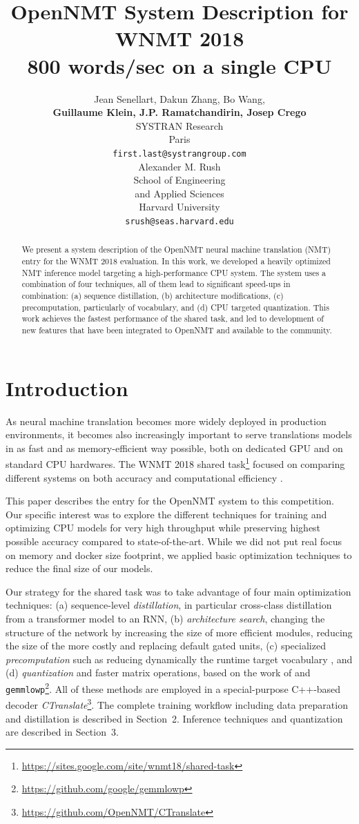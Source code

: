\documentclass[11pt,a4paper]{article}
\title{OpenNMT System Description for WNMT 2018 \protect\\ 800 words/sec on a single CPU}
\author{Jean Senellart, Dakun Zhang, Bo Wang,\\{\bf Guillaume Klein, J.P. Ramatchandirin, Josep Crego}\\
  SYSTRAN Research\\
  Paris \\
  {\tt first.last@systrangroup.com} \\\And
  Alexander M. Rush\\
  School of Engineering \\
  and Applied Sciences \\
  Harvard University \\
  {\tt srush@seas.harvard.edu} \\}
\date{}
\begin{document}
\maketitle
\begin{abstract}

  We present a system description of the OpenNMT neural machine translation (NMT) entry for the WNMT 2018 evaluation.
  In this work, we developed a heavily optimized NMT inference model
  targeting a high-performance CPU system. The system uses a
  combination of four techniques, all of them lead to significant
  speed-ups in combination: (a) sequence distillation, (b)
  architecture modifications, (c) precomputation, particularly of
  vocabulary, and (d) CPU targeted quantization. This work achieves the fastest performance of the shared task, and led to development of new features that have been integrated to OpenNMT and
  available to the community.

\end{abstract}

\section{Introduction}

As neural machine translation becomes more widely deployed in
production environments, it becomes also increasingly important to serve
translations models in as fast and as memory-efficient way possible,
both on dedicated GPU and on standard CPU hardwares. The
WNMT 2018 shared task\footnote{\url{https://sites.google.com/site/wnmt18/shared-task}}
focused on comparing different systems on both accuracy and
computational efficiency \cite{birch2018wnmt}.

This paper describes the entry for the OpenNMT system to this
competition.  Our specific interest was to explore the different
techniques for training and optimizing CPU models for very high throughput
while preserving highest possible accuracy compared to state-of-the-art. While we did not put real focus
on memory and docker size footprint, we applied basic optimization
techniques to reduce the final size of our models.

Our strategy for the shared task was to take advantage of four main
optimization techniques: (a) sequence-level \textit{distillation}, in
particular cross-class distillation from a transformer model
\cite{vaswani2017attention} to an RNN, (b) \textit{architecture
  search}, changing the structure of the network by increasing the
size of more efficient modules, reducing the size of the more costly
and replacing default gated units,  (c)
specialized \textit{precomputation} such as reducing dynamically the
runtime target vocabulary \cite{shi2017speeding}, and (d) \textit{quantization} and
faster matrix operations, based on the work of
 and {\tt
  gemmlowp}\footnote{\url{https://github.com/google/gemmlowp}}. All of these
methods are employed in a special-purpose C++-based decoder
\textit{CTranslate}\footnote{\url{https://github.com/OpenNMT/CTranslate}}.
The complete training workflow including data preparation and
distillation is described in Section~2. Inference techniques and quantization are
described in Section~3.
\end{document}
